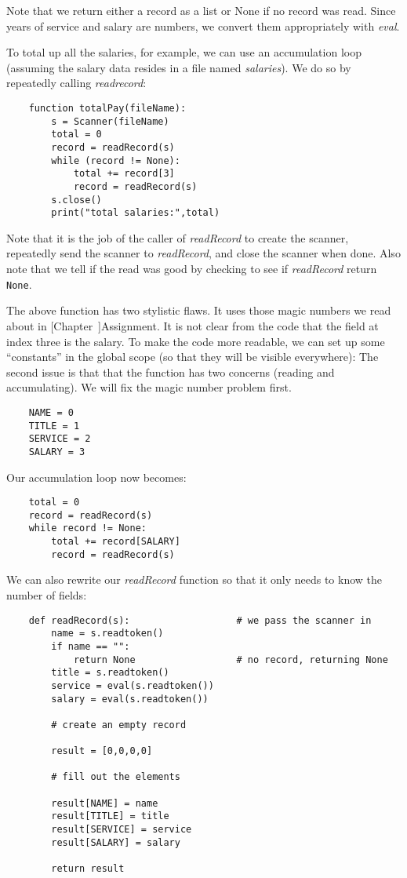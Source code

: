 Note that we return either a record as a list or None if
no record was read.
Since years of service and salary are numbers, we
convert them appropriately with {\it eval}.

To total up all the salaries, for example, we can use an accumulation
loop (assuming the salary data resides in a file named
{\it salaries}).
We do so by repeatedly calling {\it readrecord}:

\begin{verbatim}
    function totalPay(fileName):
        s = Scanner(fileName)
        total = 0
        record = readRecord(s)
        while (record != None):
            total += record[3]
            record = readRecord(s)
        s.close()            
        print("total salaries:",total)
\end{verbatim}

Note that it is the job of the caller of {\it readRecord} to
create the scanner, repeatedly send the scanner to
{\it readRecord}, and close
the scanner when done.
Also note that we tell if the read was good by checking
to see if {\it readRecord} return {\tt None}.

The above function has two stylistic flaws. It uses those
magic numbers we read about in 
[Chapter~\Ref]{Assignment}.
It is not clear from the code that the field at index
three is the salary.
To make the code more readable, we can set up some ``constants''
in the global scope (so that they will be visible everywhere):
The second issue is that
that the function has two concerns (reading and accumulating).
We will fix the magic number problem first.

\begin{verbatim}
    NAME = 0
    TITLE = 1
    SERVICE = 2
    SALARY = 3
\end{verbatim}

Our accumulation loop now becomes:

\begin{verbatim}
    total = 0
    record = readRecord(s)
    while record != None:
        total += record[SALARY]
        record = readRecord(s)
\end{verbatim}

We can also rewrite our {\it readRecord} function so
that it only needs to know the number of fields:

\begin{verbatim}
    def readRecord(s):                   # we pass the scanner in
        name = s.readtoken()
        if name == "":
            return None                  # no record, returning None
        title = s.readtoken()
        service = eval(s.readtoken())
        salary = eval(s.readtoken())

        # create an empty record

        result = [0,0,0,0]               

        # fill out the elements

        result[NAME] = name
        result[TITLE] = title
        result[SERVICE] = service
        result[SALARY] = salary

        return result
\end{verbatim}

